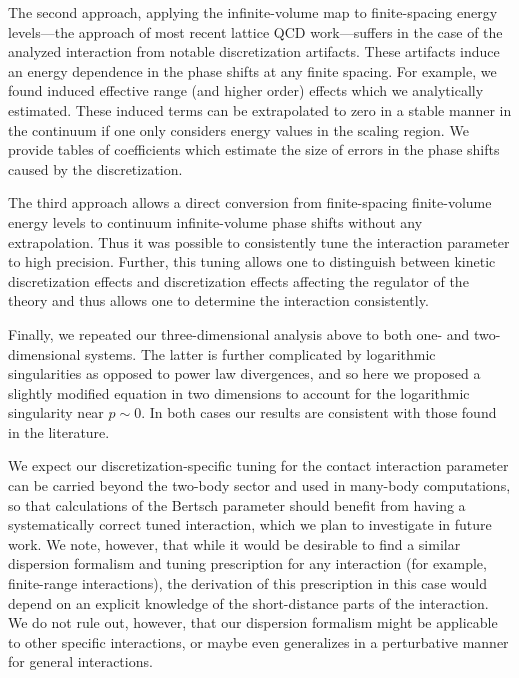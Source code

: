 The second approach, applying the infinite-volume map to finite-spacing energy levels---the approach of most recent lattice QCD work---suffers in the case of the analyzed interaction from notable discretization artifacts.
These artifacts induce an energy dependence in the phase shifts at any finite spacing.
For example, we found induced effective range (and higher order) effects which we analytically estimated.
These induced terms can be extrapolated to zero in a stable manner in the continuum if one only considers energy values in the scaling region.
We provide tables of coefficients which estimate the size of errors in the phase shifts caused by the discretization.

The third approach allows a direct conversion from finite-spacing finite-volume energy levels to continuum infinite-volume phase shifts without any extrapolation.
Thus it was possible to consistently tune the interaction parameter to high precision.
Further, this tuning allows one to distinguish between kinetic discretization effects and discretization effects affecting the regulator of the theory and thus allows one to determine the interaction consistently.

Finally, we repeated our three-dimensional analysis above to both one- and two-dimensional systems.
The latter is further complicated by logarithmic singularities as opposed to power law divergences, and so here we proposed a slightly modified \Luscher equation in two dimensions to account for the logarithmic singularity near $p\sim 0$.
In both cases our results are consistent with those found in the literature.

We expect our discretization-specific tuning for the contact interaction parameter can be carried beyond the two-body sector and used in many-body computations, so that calculations of the Bertsch parameter should benefit from having a systematically correct tuned interaction, which we plan to investigate in future work.
We note, however, that while it would be desirable to find a similar dispersion formalism and tuning prescription for any interaction (for example, finite-range interactions), the derivation of this prescription in this case would depend on an explicit knowledge of the short-distance parts of the interaction.
We do not rule out, however, that our dispersion formalism might be applicable to other specific interactions, or maybe even generalizes in a perturbative manner for general interactions.  %

